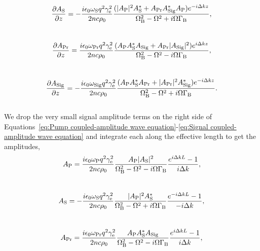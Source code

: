 \\
\begin{equation}
    \frac{\partial A_{\rm S}}{\partial z} = -\frac{i\epsilon_{0}\omega_{\rm S} q^{2}\gamma_{\rm e}^{2}}{2nc\rho_{0}}\frac{(|A_{\rm P}|^{2}A_{\rm S}^{*} + A_{\rm Pr}A_{\rm Sig}^{*}A_{\rm P})e^{-i\Delta kz}}{\Omega_{\rm B}^{2} - \Omega^{2} + i\Omega\Gamma_{\rm B}},
\end{equation}
\\
\begin{equation}
    \frac{\partial A_{\rm Pr}}{\partial z} = \frac{i\epsilon_{0}\omega_{\rm Pr} q^{2}\gamma_{\rm e}^{2}}{2nc\rho_{0}}\frac{(A_{\rm P}A_{\rm S}^{*}A_{\rm Sig} + A_{\rm Pr}|A_{\rm Sig}|^{2})e^{i\Delta kz}}{\Omega_{\rm B}^{2} - \Omega^{2} - i\Omega\Gamma_{\rm B}},
\end{equation}
\\
\begin{equation}
    \frac{\partial A_{\rm Sig}}{\partial z} = -\frac{i\epsilon_{0}\omega_{\rm Sig} q^{2}\gamma_{\rm e}^{2}}{2nc\rho_{0}}\frac{(A_{\rm P}A_{\rm S}^{*}A_{\rm Pr} + |A_{\rm Pr}|^{2}A_{\rm Sig}^{*})e^{-i\Delta kz}}{\Omega_{\rm B}^{2} - \Omega^{2} + i\Omega\Gamma_{\rm B}}.
    \label{eq:Signal coupled-amplitude wave equation}
\end{equation}
\\
We drop the very small signal amplitude terms on the right side of Equations~\ref{eq:Pump coupled-amplitude wave equation}-\ref{eq:Signal coupled-amplitude wave equation} and integrate each along the effective length to get the amplitudes,
\\
\begin{equation}
  A_{\rm P} = \frac{i\epsilon_{0}\omega_{\rm P}q^{2}\gamma_{\rm e}^{2}}{2nc\rho_{0}}\frac{A_{\rm P}|A_{\rm S}|^{2}}{\Omega_{\rm B}^{2} - \Omega^{2} - i\Omega\Gamma_{\rm B}} \frac{e^{i\Delta kL} - 1}{i\Delta k},
\end{equation}
\\
\begin{equation}
  A_{\rm S} = -\frac{i\epsilon_{0}\omega_{\rm S}q^{2}\gamma_{\rm e}^{2}}{2nc\rho_{0}}\frac{|A_{\rm P}|^{2}A_{\rm S}^{*}}{\Omega_{\rm B}^{2} - \Omega^{2} + i\Omega\Gamma_{\rm B}} \frac{e^{-i\Delta kL} - 1}{-i\Delta k},
\end{equation}
\\
\begin{equation}
  A_{\rm Pr} = \frac{i\epsilon_{0}\omega_{\rm Pr}q^{2}\gamma_{\rm e}^{2}}{2nc\rho_{0}}\frac{A_{\rm P}A_{\rm S}^{*}A_{\rm Sig}}{\Omega_{\rm B}^{2} - \Omega^{2} - i\Omega\Gamma_{\rm B}} \frac{e^{i\Delta kL} - 1}{i\Delta k},
\end{equation}
